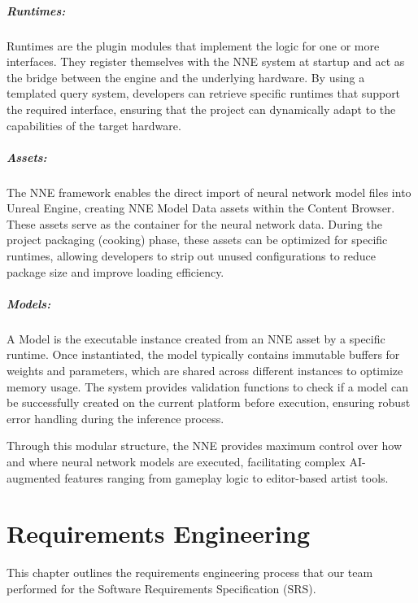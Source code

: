 \documentclass[12pt,a4paper]{report}
\begin{document}
\paragraph{Runtimes:} Runtimes are the plugin modules that implement the logic for one or more interfaces. They register themselves with the NNE system at startup and act as the bridge between the engine and the underlying hardware. By using a templated query system, developers can retrieve specific runtimes that support the required interface, ensuring that the project can dynamically adapt to the capabilities of the target hardware.

\paragraph{Assets:} The NNE framework enables the direct import of neural network model files into Unreal Engine, creating NNE Model Data assets within the Content Browser. These assets serve as the container for the neural network data. During the project packaging (cooking) phase, these assets can be optimized for specific runtimes, allowing developers to strip out unused configurations to reduce package size and improve loading efficiency.

\paragraph{Models:} A Model is the executable instance created from an NNE asset by a specific runtime. Once instantiated, the model typically contains immutable buffers for weights and parameters, which are shared across different instances to optimize memory usage. The system provides validation functions to check if a model can be successfully created on the current platform before execution, ensuring robust error handling during the inference process.

Through this modular structure, the NNE provides maximum control over how and where neural network models are executed, facilitating complex AI-augmented features ranging from gameplay logic to editor-based artist tools.


\chapter{Requirements Engineering}
This chapter outlines the requirements engineering process that our team performed for the Software Requirements Specification (SRS).
\end{document}
